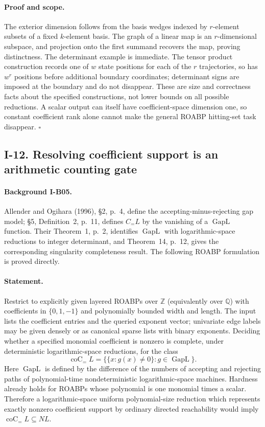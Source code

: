 \documentclass[11pt,a4paper]{article}
\theoremstyle{definition}\newtheorem{definition}{Definition}
\begin{document}
\paragraph{Proof and scope.}
The exterior dimension follows from the basis wedges indexed
by $r$-element subsets of a fixed $k$-element basis.  The graph
of a linear map is an $r$-dimensional subspace, and projection
onto the first summand recovers the map, proving distinctness.
The determinant example is immediate.  The tensor product
construction records one of $w$ state positions for each of
the $r$ trajectories, so has $w^r$ positions before additional
boundary coordinates; determinant signs are imposed at the
boundary and do not disappear.  These are size and correctness
facts about the specified constructions, not lower bounds on
all possible reductions.  A scalar output can itself have
coefficient-space dimension one, so constant coefficient rank
alone cannot make the general ROABP hitting-set task disappear.
\hfill$\square$

\subsection{I-12. Resolving coefficient support is an arithmetic counting gate}
\label{I-12}

\paragraph{Background I-B05.}
Allender and Ogihara (1996), \S2, p.~4, define the accepting-minus-rejecting
gap model; \S5, Definition~2, p.~11, defines $C_{=}L$ by the vanishing
of a $\operatorname{GapL}$ function.  Their Theorem~1, p.~2, identifies
$\operatorname{GapL}$ with logarithmic-space reductions to integer
determinant, and Theorem~14, p.~12, gives the corresponding singularity
completeness result.  The following ROABP formulation is proved directly.

\paragraph{Statement.}
Restrict to explicitly given layered ROABPs over $\mathbb Z$
(equivalently over $\mathbb Q$) with coefficients in
$\{0,1,-1\}$ and polynomially bounded width and length.  The input
lists the coefficient entries and the queried exponent vector;
univariate edge labels may be given densely or as canonical sparse
lists with binary exponents.  Deciding
whether a specified monomial coefficient is nonzero is complete,
under deterministic logarithmic-space reductions, for the class
\[
 \operatorname{coC}_{=}L
   =\{\{x:g(x)\ne0\}:g\in\operatorname{GapL}\}.
\]
Here $\operatorname{GapL}$ is defined by the difference of the
numbers of accepting and rejecting paths of polynomial-time
nondeterministic logarithmic-space machines.  Hardness already
holds for ROABPs whose polynomial is one monomial times a scalar.
Therefore a logarithmic-space uniform polynomial-size reduction
which represents exactly nonzero coefficient support by ordinary
directed reachability would imply
$\operatorname{coC}_{=}L\subseteq NL$.
\end{document}
